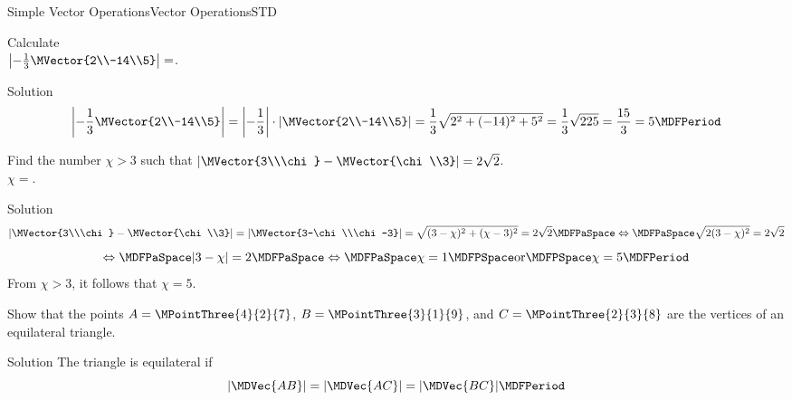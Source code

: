 \begin{MXContent}{Simple Vector Operations}{Vector Operations}{STD}
\begin{MExample}
\end{MExample}

\begin{MExercise}
Calculate\\
$\left|-\frac{1}{3}\MVector{2\\-14\\5}\right|=$.
\begin{MHint}{Solution}
\[
 \left|-\frac{1}{3}\MVector{2\\-14\\5}\right|=\left|-\frac{1}{3}\right|\cdot\left|\MVector{2\\-14\\5}\right|=\frac{1}{3}\sqrt{2^2+(-14)^2+5^2}=\frac{1}{3}\sqrt{225}=\frac{15}{3}=5 \MDFPeriod
\]
 
\end{MHint}

\end{MExercise}


\begin{MExercise}
Find the number $\chi>3$ such that $\left|\MVector{3\\\chi}-\MVector{\chi\\3}\right|=2\sqrt{2}$.\\
$\chi=$.
\end{MExercise}

\begin{MHint}{Solution}
\[
\left|\MVector{3\\\chi}-\MVector{\chi\\3}\right| =\left|\MVector{3-\chi\\\chi-3}\right|=\sqrt{(3-\chi)^2+(\chi-3)^2}=2\sqrt{2}\MDFPaSpace\Leftrightarrow\MDFPaSpace\sqrt{2(3-\chi)^2}=2\sqrt{2}
\]
\[
 \Leftrightarrow\MDFPaSpace|3-\chi|=2\MDFPaSpace\Leftrightarrow\MDFPaSpace\chi=1\MDFPSpace\textrm{or}\MDFPSpace\chi=5 \MDFPeriod
\]
From $\chi>3$, it follows that $\chi=5$.
\end{MHint}

\begin{MExercise}
Show that the points $A=\MPointThree{4}{2}{7}$, $B=\MPointThree{3}{1}{9}$, and $C=\MPointThree{2}{3}{8}$ 
are the vertices of an equilateral triangle.
\end{MExercise}

\begin{MHint}{Solution}
The triangle is equilateral if
\[
 |\MDVec{A B}| = |\MDVec{A C}| = |\MDVec{B C}| \MDFPeriod
\]


\end{MHint}
\end{MXContent}
